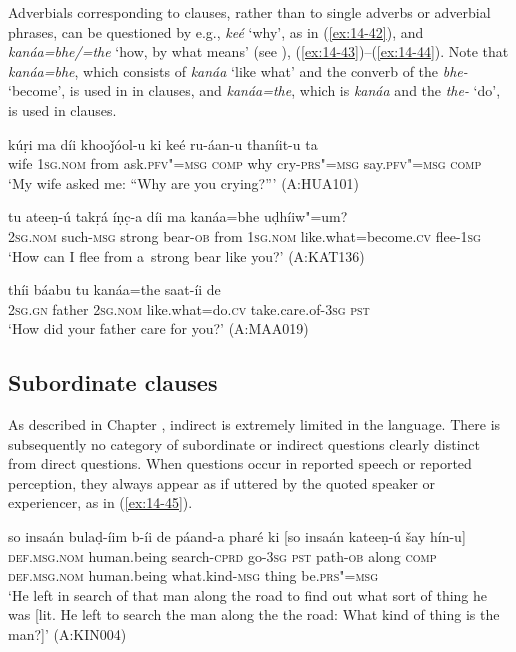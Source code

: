 Adverbials corresponding to clauses, rather than to single adverbs or adverbial phrases, can be questioned by e.g., \textit{keé} `why', as in (\ref{ex:14-42}), and \textit{kanáa=bhe/=the} `how, by what means' (see ), (\ref{ex:14-43})--(\ref{ex:14-44}). Note that \textit{kanáa=bhe}, which consists of \textit{kanáa} `like what' and the converb of the  \textit{bhe-} `become', is used in in clauses, and \textit{kanáa=the}, which is \textit{kanáa} and the  \textit{the-} `do', is used in  clauses.

\begin{exe}
\ex
\label{ex:14-42}
\gll kúṛi ma díi khooǰóol-u ki keé  ru-áan-u thaníit-u ta \\
wife \textsc{1sg.nom} from ask.\textsc{pfv"=msg} \textsc{comp} why  cry-\textsc{prs"=msg} say.\textsc{pfv"=msg} \textsc{comp}\\
\glt `My wife asked me: ``Why are you crying?''' (A:HUA101)

\ex
\label{ex:14-43}
\gll tu ateeṇ-ú takṛá íṇc̣-a díi ma  kanáa=bhe uḍhíiw"=um? \\
\textsc{2sg.nom} such-\textsc{msg} strong bear-\textsc{ob} from \textsc{1sg.nom}  like.what=become.\textsc{cv} flee-\textsc{1sg} \\
\glt `How can I flee from a~strong bear like you?' (A:KAT136)

\ex
\label{ex:14-44}
\gll thíi báabu tu kanáa=the saat-íi de \\
\textsc{2sg.gn} father \textsc{2sg.nom} like.what=do.\textsc{cv} take.care.of-\textsc{3sg} \textsc{pst} \\
\glt `How did your father care for you?' (A:MAA019)
\end{exe}

\subsection{Subordinate  clauses}
\label{subsec:14-2-3}


As described in Chapter , indirect  is extremely limited in the language. There is subsequently no category of subordinate or indirect questions clearly distinct from direct questions. When questions occur in reported speech or reported perception, they always appear as if uttered by the quoted speaker or experiencer, as in (\ref{ex:14-45}).

\begin{exe}
\ex
\label{ex:14-45}
\gll so insaán bulaḍ-íim b-íi de  páand-a pharé ki [so insaán  kateeṇ-ú šay hín-u] \\
\textsc{def.msg.nom} human.being search-\textsc{cprd} go-\textsc{3sg} \textsc{pst} path-\textsc{ob} along \textsc{comp} \textsc{def.msg.nom} human.being what.kind-\textsc{msg} thing be.\textsc{prs"=msg } \\
\glt `He left in search of that man along the road to find out what sort of thing he was [lit. He left to search the man along the the road: What kind of thing is the man?]' (A:KIN004)
\end{exe}

